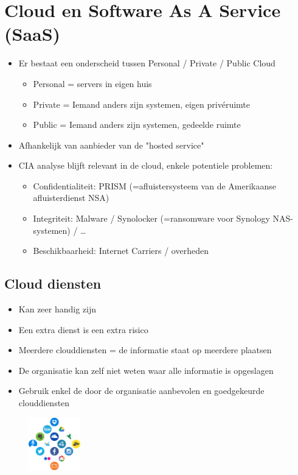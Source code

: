 \documentclass{article}
\begin{document}
\section{Cloud en Software As A Service (SaaS)}

\begin{itemize}
    \item Er bestaat een onderscheid tussen Personal / Private / Public Cloud
    \begin{itemize}
        \item Personal = servers in eigen huis
        \item Private = Iemand anders zijn systemen, eigen privéruimte
        \item Public = Iemand anders zijn systemen, gedeelde ruimte
    \end{itemize}
    \item Afhankelijk van aanbieder van de "hosted service"
    \item CIA analyse blijft relevant in de cloud, enkele potentiele problemen: 
    \begin{itemize}
        \item Confidentialiteit: PRISM (=afluistersysteem van de Amerikaanse afluisterdienst NSA)
        \item Integriteit: Malware / Synolocker (=ransomware voor Synology NAS-systemen) / \dots
        \item Beschikbaarheid: Internet Carriers / overheden
    \end{itemize}
\end{itemize}

\subsection{Cloud diensten}

\begin{itemize}
    \item Kan zeer handig zijn
    \item Een extra dienst is een extra risico
    \item Meerdere clouddiensten = de informatie staat op meerdere plaatsen
    \item De organisatie kan zelf niet weten waar alle informatie is opgeslagen
    \item Gebruik enkel de door de organisatie aanbevolen en goedgekeurde clouddiensten
\end{itemize}

\begin{figure}[H]
    \centering
    \includegraphics[width=0.2\textwidth]{cloud-diensten.png}
    \caption{}
\end{figure}
\end{document}
